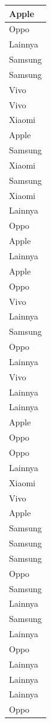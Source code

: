 \documentclass[
  letterpaper,
  DIV=11,
  numbers=noendperiod]{scrartcl}
\begin{document}
\begin{table}
\begin{tabular}[t]{l}
\hline
Apple\\
\hline
Oppo\\
\hline
Lainnya\\
\hline
Samsung\\
\hline
Samsung\\
\hline
Vivo\\
\hline
Vivo\\
\hline
Xiaomi\\
\hline
Apple\\
\hline
Samsung\\
\hline
Xiaomi\\
\hline
Samsung\\
\hline
Xiaomi\\
\hline
Lainnya\\
\hline
Oppo\\
\hline
Apple\\
\hline
Lainnya\\
\hline
Apple\\
\hline
Oppo\\
\hline
Vivo\\
\hline
Lainnya\\
\hline
Samsung\\
\hline
Oppo\\
\hline
Lainnya\\
\hline
Vivo\\
\hline
Lainnya\\
\hline
Lainnya\\
\hline
Apple\\
\hline
Oppo\\
\hline
Oppo\\
\hline
Lainnya\\
\hline
Xiaomi\\
\hline
Vivo\\
\hline
Apple\\
\hline
Samsung\\
\hline
Samsung\\
\hline
Samsung\\
\hline
Oppo\\
\hline
Samsung\\
\hline
Lainnya\\
\hline
Samsung\\
\hline
Lainnya\\
\hline
Oppo\\
\hline
Lainnya\\
\hline
Lainnya\\
\hline
Lainnya\\
\hline
Oppo\\

\end{tabular}
\end{table}
\end{document}

